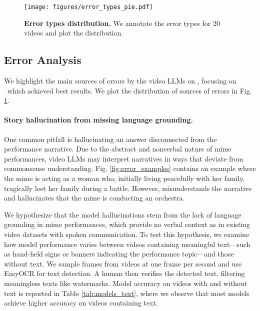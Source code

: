 \begin{figure}
    \centering
    \texttt{[image: figures/error\_types\_pie.pdf]}
    \caption{\textbf{Error types distribution.} We annotate the error types for 20 videos and plot the distribution.}
    \vspace{-2mm}
    \label{fig:error_types}
\end{figure}

\subsection{Error Analysis}

We highlight the main sources of errors by the video LLMs on \data, focusing on \gemini~which achieved best results. We plot the distribution of sources of errors in Fig. \ref{fig:error_types}.

\paragraph{Story hallucination from missing language grounding.} One common pitfall is hallucinating an answer disconnected from the performance narrative. Due to the abstract and nonverbal nature of mime performances, video LLMs may interpret narratives in ways that deviate from commonsense understanding. Fig. \ref{fig:error_examples} contains an example where the mime is acting as a woman who, initially living peacefully with her family, tragically lost her family during a battle. However, {\gemini} misunderstands the narrative and hallucinates that the mime is conducting an orchestra. 

We hypothesize that the model hallucinations stem from the lack of language grounding in mime performances, which provide no verbal context as in existing video datasets with spoken communication. To test this hypothesis, we examine how model performance varies between videos containing meaningful text—such as hand-held signs or banners indicating the performance topic—and those without text. We sample frames from videos at one frame per second and use EasyOCR \cite{EasyOCR} for text detection. A human then verifies the detected text, filtering meaningless texts like watermarks. Model accuracy on videos with and without text is reported in Table \ref{tab:models_text}, where we observe that most models achieve higher accuracy on videos containing text.

